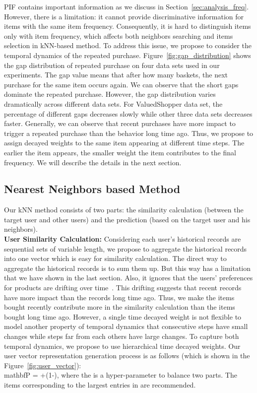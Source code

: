 \documentclass[sigconf]{acmart}
\begin{document}
PIF contains important information as we discuss in Section~\ref{sec:analysis_freq}. However, there is a limitation: it  cannot provide  discriminative information for items with the same item frequency. Consequently,  it is hard to  distinguish items only with item frequency, which affects both neighbors searching and items selection in kNN-based method. To address this issue, we propose to consider the temporal dynamics of the repeated purchase.  Figure~\ref{fig:gap_distribution} shows the gap distribution of repeated purchase on four data sets used in our experiments. The gap value means that after  how many baskets, the next purchase for the same item occurs again. We can observe that the short gaps dominate the repeated purchase. However, the gap distribution varies dramatically across different data sets. For ValuedShopper data set, the percentage of different gaps decreases slowly while other three data sets decreases faster. Generally, we can observe that recent purchases have more impact to trigger a repeated purchase than the behavior long time ago. Thus, we propose to assign decayed weights to the same item appearing at different time steps. The earlier the item appears, the smaller weight the item contributes to the final  frequency. We will describe the details in the next section. 

\subsection{Nearest Neighbors based Method}
\label{sec:representation}
Our kNN method consists of  two parts: the similarity calculation (between the target user and other users) and the prediction (based on the target user and his neighbors).\\ 
\textbf{User Similarity Calculation:} Considering each  user's historical records are  sequential sets of variable length, we propose to aggregate the historical records  into one vector which is easy for similarity calculation. The direct way to aggregate the  historical records is to sum them up. But this way has a limitation that we have shown in the last section. Also, it ignores that the users' preferences for products are drifting over time~\cite{koren2009collaborative}. This drifting  suggests that recent  records have more impact  than the records long time ago. Thus, we make the  items bought recently  contribute more in  the similarity calculation than the items bought long time ago. However, a single time decayed weight is not flexible to model another  property of temporal  dynamics that consecutive  steps have small changes  while  steps far from each others have large changes. To capture both temporal  dynamics, we propose to use  hierarchical time decayed weights. Our user vector representation generation process is as follows (which is shown in the Figure~\ref{fig:user_vector}): 
\\mathbf{P} = \alpha\cdot{}+(1-\alpha)\cdot{}, where the  is a hyper-parameter to balance two parts. The  items  corresponding to the largest   entries in   are recommended.   
\end{document}
